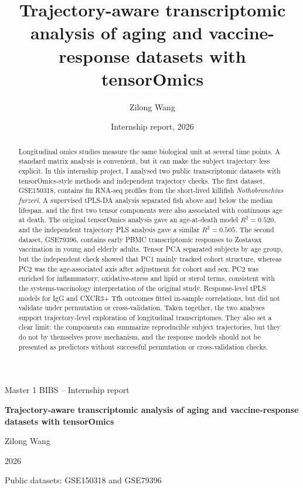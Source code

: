 \documentclass[11pt,a4paper]{article}
\title{\textbf{Trajectory-aware transcriptomic analysis of aging and vaccine-response datasets with tensorOmics}}
\author{Zilong Wang}
\date{Internship report, 2026}
\begin{document}
\begin{titlepage}
  \centering
  \vspace*{2cm}
  {\Large Master 1 BIBS -- Internship report\par}
  \vspace{1.2cm}
  {\huge\bfseries Trajectory-aware transcriptomic analysis of aging and vaccine-response datasets with tensorOmics\par}
  \vspace{1.5cm}
  {\Large Zilong Wang\par}
  \vspace{0.8cm}
  {\large 2026\par}
  \vfill
  {\large Public datasets: GSE150318 and GSE79396\par}
\end{titlepage}

\tableofcontents
\clearpage

\begin{abstract}
Longitudinal omics studies measure the same biological unit at several time points. A standard matrix analysis is convenient, but it can make the subject trajectory less explicit. In this internship project, I analysed two public transcriptomic datasets with tensorOmics-style methods and independent trajectory checks. The first dataset, GSE150318, contains fin RNA-seq profiles from the short-lived killifish \textit{Nothobranchius furzeri}. A supervised tPLS-DA analysis separated fish above and below the median lifespan, and the first two tensor components were also associated with continuous age at death. The original tensorOmics analysis gave an age-at-death model $R^2=0.520$, and the independent trajectory PLS analysis gave a similar $R^2=0.505$. The second dataset, GSE79396, contains early PBMC transcriptomic responses to Zostavax vaccination in young and elderly adults. Tensor PCA separated subjects by age group, but the independent check showed that PC1 mainly tracked cohort structure, whereas PC2 was the age-associated axis after adjustment for cohort and sex. PC2 was enriched for inflammatory, oxidative-stress and lipid or sterol terms, consistent with the systems-vaccinology interpretation of the original study. Response-level tPLS models for IgG and CXCR3+ Tfh outcomes fitted in-sample correlations, but did not validate under permutation or cross-validation. Taken together, the two analyses support trajectory-level exploration of longitudinal transcriptomes. They also set a clear limit: the components can summarize reproducible subject trajectories, but they do not by themselves prove mechanism, and the response models should not be presented as predictors without successful permutation or cross-validation checks.
\end{abstract}
\end{document}
